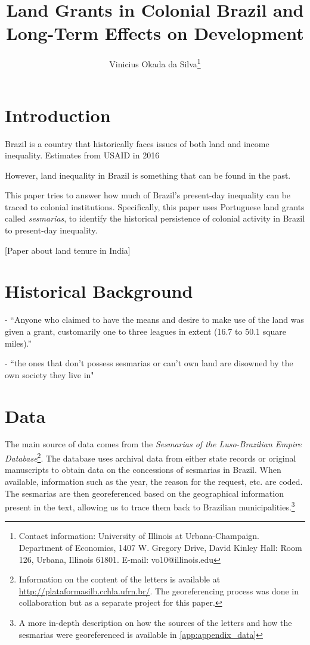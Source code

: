 \documentclass{article}
\title{Land Grants in Colonial Brazil and Long-Term Effects on Development}
\author{Vinicius Okada da Silva\thanks{Contact information: University of Illinois at Urbana-Champaign. Department of Economics, 1407 W. Gregory Drive, David Kinley Hall: Room 126, Urbana, Illinois 61801. E-mail: vo10@illinois.edu}}
\affil{Department of Economics, University of Illinois at Urbana-Champaign}
\date{}
\begin{document}
\maketitle

\clearpage
{} 

\section{Introduction}

Brazil is a country that historically faces issues of both land and income inequality. Estimates from USAID in 2016

However, land inequality in Brazil is something that can be found in the past.

This paper tries to answer how much of Brazil's present-day inequality can be traced to colonial institutions. Specifically, this paper uses Portuguese land grants called \textit{sesmarias}, to identify the historical persistence of colonial activity in Brazil to present-day inequality.



\textcite{Ratnoo2023-vw} [Paper about land tenure in India]


\section{Historical Background}

\textcite{Dean1971-iq} - ``Anyone who claimed to have the means and desire to make use of the land was given a grant, customarily one to three leagues in extent (16.7 to 50.1 square miles).''

\textcite{Simonsen1937-ps} - ``the ones that don't possess sesmarias or can't own land are disowned by the own society they live in"

\section{Data}

The main source of data comes from the \textit{Sesmarias of the Luso-Brazilian Empire Database}\footnote{
  Information on the content of the letters is available at \url{http://plataformasilb.cchla.ufrn.br/}. The georeferencing process was done in collaboration but as a separate project for this paper.}.
The database uses archival data from either state records or original manuscripts to obtain data on the concessions of sesmarias in Brazil. 
When available, information such as the year, the reason for the request, etc. are coded. 
The sesmarias are then georeferenced based on the geographical information present in the text, allowing us to trace them back to Brazilian municipalities.\footnote{A more in-depth description on how the sources of the letters and how the sesmarias were georeferenced is available in \autoref{app:appendix_data}}
\end{document}
